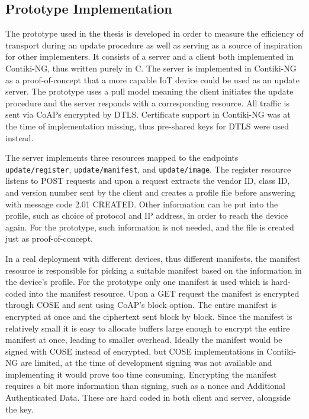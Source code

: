 \documentclass[0-thesis.tex]{subfiles}
\begin{document}
\subsection{Prototype Implementation}
\label{ssec:prototype-implementation}
The prototype used in the thesis is developed in order to measure the efficiency of
transport during an update procedure as well as serving as a source of inspiration for
other implementers. It consists of a server and a client both implemented in Contiki-NG,
thus written purely in C. The server is implemented in Contiki-NG as a proof-of-concept
that a more capable IoT device could be used as an update server. The prototype uses a
pull model meaning the client initiates the update procedure and the server responds with
a corresponding resource. All traffic is sent via CoAPs encrypted by DTLS. Certificate
support in Contiki-NG was at the time of implementation missing, thus pre-shared keys for
DTLS were used instead.

The server implements three resources mapped to the endpoints \texttt{update/register},
\texttt{update/manifest}, and \texttt{update/image}. The register resource listens to POST
requests and upon a request extracts the vendor ID, class ID, and version number sent by
the client and creates a profile file before answering with message code 2.01 CREATED.
Other information can be put into the profile, such as choice of protocol and IP address,
in order to reach the device again. For the prototype, such information is not needed, and
the file is created just as proof-of-concept.

In a real deployment with different devices, thus different manifests, the manifest
resource is responsible for picking a suitable manifest based on the information in the
device's profile. For the prototype only one manifest is used which is hard-coded into the
manifest resource. Upon a GET request the manifest is encrypted through COSE and sent
using CoAP's block option. The entire manifest is encrypted at once and the ciphertext
sent block by block. Since the manifest is relatively small it is easy to allocate buffers
large enough to encrypt the entire manifest at once, leading to smaller overhead. Ideally
the manifest would be signed with COSE instead of encrypted, but COSE implementations in
Contiki-NG are limited, at the time of development signing was not available and
implementing it would prove too time consuming. Encrypting the manifest requires a bit
more information than signing, such as a nonce and Additional Authenticated Data. These
are hard coded in both client and server, alongside the key.
\end{document}

